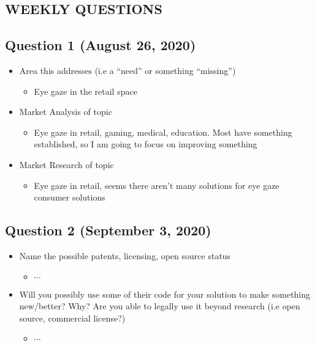 \begin{center}
  \section*{\Huge\textbf{WEEKLY QUESTIONS}}
\end{center}
\subsection*{\Large\textbf{Question 1 (August 26, 2020)}}
\begin{itemize}
 \item Area this addresses (i.e a “need” or something “missing”)
 \begin{itemize}
   \item Eye gaze in the retail space
 \end{itemize}
 \item Market Analysis of topic
 \begin{itemize}
   \item Eye gaze in retail, gaming, medical, education. Most have something established, so I am going to focus on improving something
 \end{itemize}
 \item Market Research of topic
 \begin{itemize}
   \item Eye gaze in retail, seems there aren’t many solutions for eye gaze consumer solutions
 \end{itemize}
\end{itemize}
\subsection*{\Large\textbf{Question 2 (September 3, 2020)}}
\begin{itemize}
 \item Name the possible patents, licensing, open source status
 \begin{itemize}
   \item \(\cdots \)
 \end{itemize}
 \item Will you possibly use some of their code for your solution to
 make something new/better? Why? Are you able to legally use it beyond research (i.e open source, commercial license?)
 \begin{itemize}
   \item \(\cdots \)
 \end{itemize}
\end{itemize}
